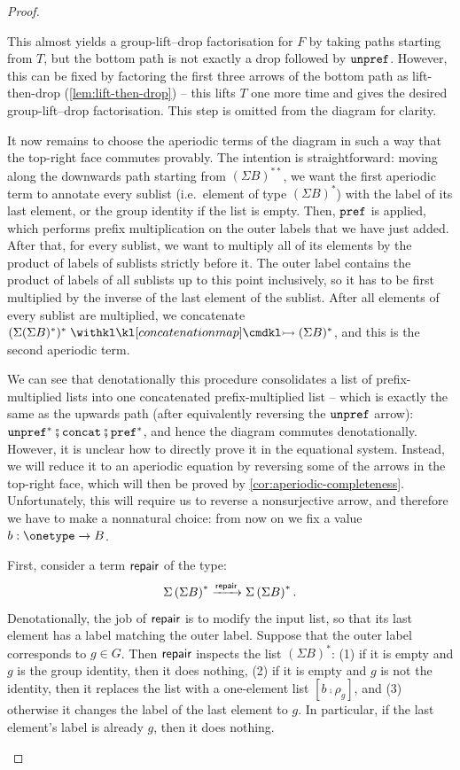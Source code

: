 \begin{proof}
\begin{description}
        This almost yields a group-lift--drop factorisation for $F$ by taking paths starting from $T$, but the bottom path is not exactly a drop followed by $\mathtt{unpref}$. However, this can be fixed by factoring the first three arrows of the bottom path as lift-then-drop (\cref{lem:lift-then-drop}) -- this lifts $T$ one more time and gives the desired group-lift--drop factorisation. This step is omitted from the diagram for clarity.

        It now remains to choose the aperiodic terms of the diagram in such a way that the top-right face commutes provably. The intention is straightforward: moving along the downwards path starting from $(\Sigma B)^{**}$, we want the first aperiodic term to annotate every sublist (i.e.~element of type $(\Sigma B)^*$) with the label of its last element, or the group identity if the list is empty. Then, $\mathtt{pref}$ is applied, which performs prefix multiplication on the outer labels that we have just added. After that, for every sublist, we want to multiply all of its elements by the product of labels of sublists strictly before it. The outer label contains the product of labels of all sublists up to this point inclusively, so it has to be first multiplied by the inverse of the last element of the sublist. After all elements of every sublist are multiplied, we concatenate $(\Sigma (\Sigma B)^*)^* \concmap (\Sigma B)^*$, and this is the second aperiodic term.

        We can see that denotationally this procedure consolidates a list of prefix-multiplied lists into one concatenated prefix-multiplied list -- which is exactly the same as the upwards path (after equivalently reversing the $\mathtt{unpref}$ arrow): $\unprefterm^* \comp \concatterm \comp \prefterm^*$, and hence the diagram commutes denotationally. However, it is unclear how to directly prove it in the equational system. Instead, we will reduce it to an aperiodic equation by reversing some of the arrows in the top-right face, which will then be proved by \cref{cor:aperiodic-completeness}. Unfortunately, this will require us to reverse a nonsurjective arrow, and therefore we have to make a nonnatural choice: from now on we fix a value $b : \onetype \to B$.
        
        First, consider a term $\mathsf{repair}$ of the type:
        \[
            \Sigma \left( \Sigma B \right)^* \xrightarrow{\mathsf{repair}} \Sigma \left( \Sigma B \right)^*.
        \]
        Denotationally, the job of $\mathsf{repair}$ is to modify the input list, so that its last element has a label matching the outer label. Suppose that the outer label corresponds to $g \in G$. Then $\mathsf{repair}$ inspects the list $(\Sigma B)^*$: (1) if it is empty and $g$ is the group identity, then it does nothing, (2) if it is empty and $g$ is not the identity, then it replaces the list with a one-element list $[b\comp\rho_g]$, and (3) otherwise it changes the label of the last element to $g$. In particular, if the last element's label is already $g$, then it does nothing. 


\end{description}
\end{proof}
